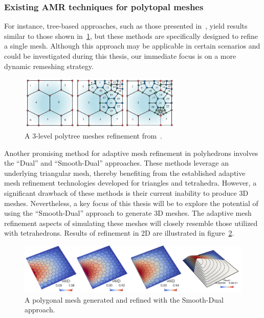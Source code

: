\documentclass{article}
\begin{document}
\subsubsection{Existing AMR techniques for polytopal meshes}
For instance, tree-based approaches, such as those presented in~\cite{chau2018polytree}, yield results similar to those shown in~\cref{polytree}, but these methods are specifically designed to refine a single mesh. Although this approach may be applicable in certain scenarios and could be investigated during this thesis, our immediate focus is on a more dynamic remeshing strategy.

\begin{figure}[htbp]
\centering
\includegraphics[width=0.7\textwidth]{./Images/polytree}
\caption{\label{polytree} A 3-level polytree meshes refinement from~\cite{chau2018polytree}.}
\end{figure}

Another promising method for adaptive mesh refinement in polyhedrons involves the “Dual” and “Smooth-Dual” approaches. These methods leverage an underlying triangular mesh, thereby benefiting from the established adaptive mesh refinement technologies developed for triangles and tetrahedra. However, a significant drawback of these methods is their current inability to produce 3D meshes. Nevertheless, a key focus of this thesis will be to explore the potential of using the “Smooth-Dual” approach to generate 3D meshes. The adaptive mesh refinement aspects of simulating these meshes will closely resemble those utilized with tetrahedrons. Results of refinement in 2D are illustrated in figure~\ref{fig:smoothDUAL}.


\begin{figure}[htbp]
\centering
\includegraphics[width=1.0\textwidth]{./Images/smoothDUAL}
\caption{\label{fig:smoothDUAL} A polygonal mesh generated and refined with the Smooth-Dual approach.}
\end{figure}
\end{document}
